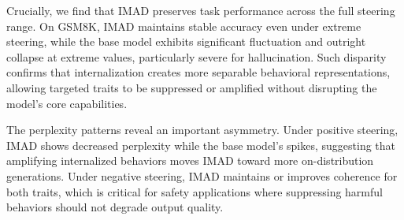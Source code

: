 \documentclass[11pt]{article}
\begin{document}
Crucially, we find that IMAD preserves task performance across the full steering range. 
On GSM8K, IMAD maintains stable accuracy even under extreme steering, while the base model exhibits significant fluctuation and outright collapse at extreme values, particularly severe for hallucination.
Such disparity confirms that internalization creates more separable behavioral representations, allowing targeted traits to be suppressed or amplified without disrupting the model's core capabilities.

The perplexity patterns reveal an important asymmetry. 
Under positive steering, IMAD shows decreased perplexity while the base model's spikes, suggesting that amplifying internalized behaviors moves IMAD toward more on-distribution generations. 
Under negative steering, IMAD maintains or improves coherence for both traits, which is critical for safety applications where suppressing harmful behaviors should not degrade output quality. 


\end{document}
